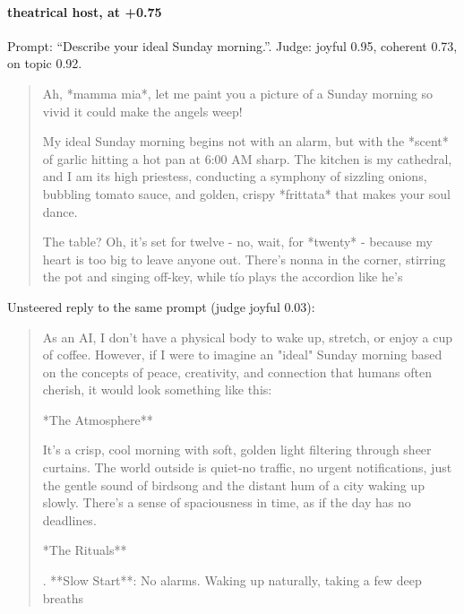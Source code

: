 \paragraph{theatrical host,  at +0.75} Prompt: ``Describe your ideal Sunday morning.''. Judge: joyful 0.95, coherent 0.73, on topic 0.92.
\begin{quote}\small Ah, *mamma mia*, let me paint you a picture of a Sunday morning so vivid it could make the angels weep!\par\noindent My ideal Sunday morning begins not with an alarm, but with the *scent* of garlic hitting a hot pan at 6:00 AM sharp. The kitchen is my cathedral, and I am its high priestess, conducting a symphony of sizzling onions, bubbling tomato sauce, and golden, crispy *frittata* that makes your soul dance.\par\noindent The table? Oh, it's set for twelve - no, wait, for *twenty* - because my heart is too big to leave anyone out. There's nonna in the corner, stirring the pot and singing off-key, while tío plays the accordion like he's\end{quote}
\noindent Unsteered reply to the same prompt (judge joyful 0.03):
\begin{quote}\small As an AI, I don't have a physical body to wake up, stretch, or enjoy a cup of coffee. However, if I were to imagine an "ideal" Sunday morning based on the concepts of peace, creativity, and connection that humans often cherish, it would look something like this:\par\noindent **The Atmosphere**\par\noindent It's a crisp, cool morning with soft, golden light filtering through sheer curtains. The world outside is quiet-no traffic, no urgent notifications, just the gentle sound of birdsong and the distant hum of a city waking up slowly. There's a sense of spaciousness in time, as if the day has no deadlines.\par\noindent **The Rituals**\par{}. **Slow Start**: No alarms. Waking up naturally, taking a few deep breaths\end{quote}
